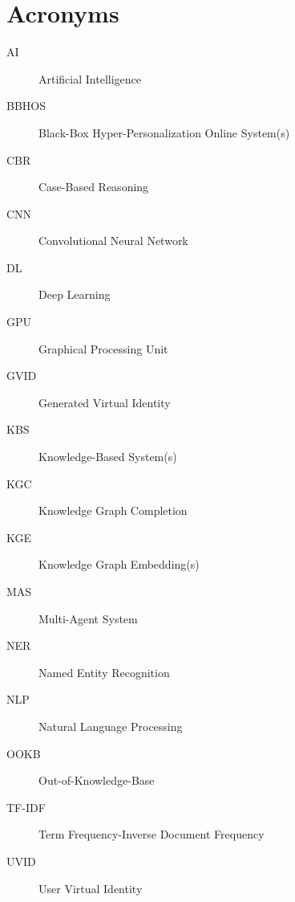 

\chapter{Acronyms}
\begin{description}
\item[AI]{Artificial Intelligence}
\item[BBHOS]{Black-Box Hyper-Personalization Online System(s)}
\item[CBR]{Case-Based Reasoning}
\item[CNN]{Convolutional Neural Network}
\item[DL]{Deep Learning}
\item[GPU]{Graphical Processing Unit}
\item[GVID]{Generated Virtual Identity}
\item[KBS]{Knowledge-Based System(s)}
\item[KGC]{Knowledge Graph Completion}
\item[KGE]{Knowledge Graph Embedding(s)}
\item[MAS]{Multi-Agent System}
\item[NER]{Named Entity Recognition}
\item[NLP]{Natural Language Processing}
\item[OOKB]{Out-of-Knowledge-Base}
\item[TF-IDF]{Term Frequency-Inverse Document Frequency}
\item[UVID]{User Virtual Identity}

\end{description}




